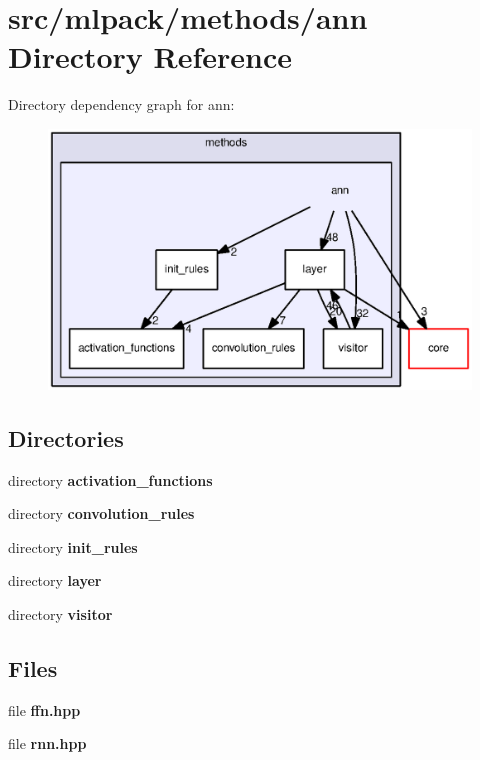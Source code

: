 \section{src/mlpack/methods/ann Directory Reference}
\label{dir_04cdefcc9a97fb221ee3f2d7fb8aab76}
Directory dependency graph for ann\+:
\nopagebreak
\begin{figure}[H]
\begin{center}
\leavevmode
\includegraphics[width=350pt]{dir_04cdefcc9a97fb221ee3f2d7fb8aab76_dep}
\end{center}
\end{figure}
\subsection*{Directories}
\begin{DoxyCompactItemize}
\item 
directory {\bf activation\+\_\+functions}
\item 
directory {\bf convolution\+\_\+rules}
\item 
directory {\bf init\+\_\+rules}
\item 
directory {\bf layer}
\item 
directory {\bf visitor}
\end{DoxyCompactItemize}
\subsection*{Files}
\begin{DoxyCompactItemize}
\item 
file {\bf ffn.\+hpp}
\item 
file {\bf rnn.\+hpp}
\end{DoxyCompactItemize}
